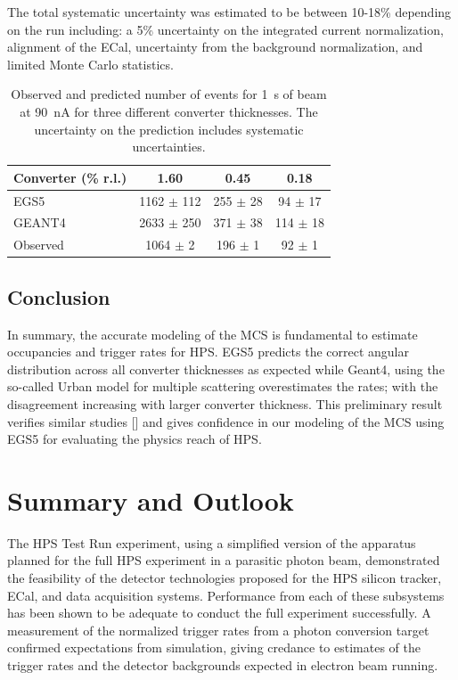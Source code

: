 \documentclass[final,3p,times,twocolumn]{elsarticle}
\newcommand{\geant}{{\sc Geant4}}
\newcommand{\egs}{{\sc EGS5}}
\begin{document}
The total systematic uncertainty was estimated to be between 10-18\% depending on the run including:  
a 5\% uncertainty on the integrated current normalization, alignment of the ECal, uncertainty from the 
background normalization, and limited Monte Carlo statistics.  
\begin{center}
\begin{table}
{\small
\begin{tabular}{|l|c|c|c|}
\hline
Converter (\% r.l.) & 1.60 & 0.45 &	0.18 \\
\hline
EGS5 &	1162 $\pm$ 112 &	255 $\pm$ 28 &	94 $\pm$ 17	\\
\hline
GEANT4 & 2633 $\pm$ 250 & 	371 $\pm$ 38 &	114 $\pm$ 18 \\
\hline
Observed 	& 1064 $\pm$ 2 & 196 $\pm$ 1 &	92 $\pm$ 1 \\						
\hline
\end{tabular}
\caption{ Observed and predicted number of events for 1~s of beam at 90~nA for three different converter 
thicknesses. The uncertainty on the prediction includes systematic uncertainties. }
}
\label{tab:ang_distr_dataMC}
\end{table}
\end{center}

\subsection{Conclusion}
In summary, the accurate modeling of the MCS is fundamental to estimate occupancies and trigger rates 
for HPS. \egs{} predicts the correct angular distribution across all converter thicknesses as expected while 
\geant{}, using the so-called Urban model for multiple scattering overestimates the rates; with the disagreement 
increasing  with larger converter thickness. This preliminary result verifies similar studies [] and gives confidence 
in our modeling of the MCS 
using \egs{} for evaluating the physics reach of HPS.






\section{Summary and Outlook}

The HPS Test Run experiment, using a simplified version of the apparatus planned for the full HPS experiment in a parasitic photon beam, demonstrated the feasibility of the detector technologies proposed for the HPS silicon tracker, ECal, and data acquisition systems. Performance from each of these subsystems has been shown to be adequate to conduct the full experiment successfully. A measurement of the normalized trigger rates from a photon conversion target confirmed expectations from simulation, giving credance to estimates of the trigger rates and the detector backgrounds expected in electron beam running.  
\end{document}
